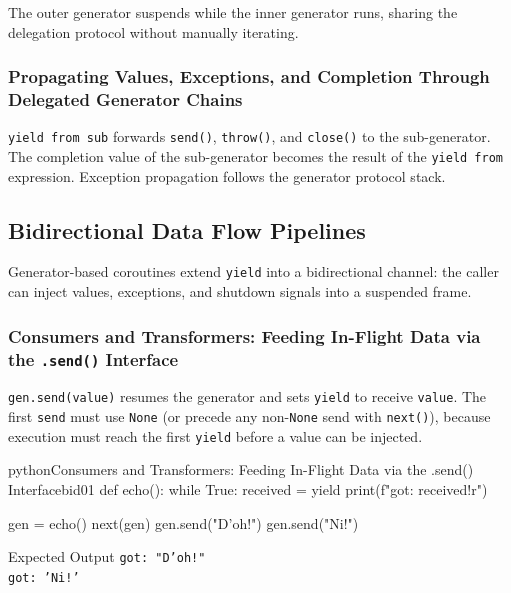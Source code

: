 \documentclass[a4paper,twoside]{report}
\begin{document}
The outer generator suspends while the inner generator runs, sharing the delegation protocol without manually iterating.

\subsubsection{Propagating Values, Exceptions, and Completion Through Delegated Generator Chains}

\texttt{yield from sub} forwards \texttt{send()}, \texttt{throw()}, and \texttt{close()} to the sub-generator. The completion value of the sub-generator becomes the result of the \texttt{yield from} expression. Exception propagation follows the generator protocol stack.


\subsection{Bidirectional Data Flow Pipelines}

Generator-based coroutines extend \texttt{yield} into a bidirectional channel: the caller can inject values, exceptions, and shutdown signals into a suspended frame.

\subsubsection{Consumers and Transformers: Feeding In-Flight Data via the \texttt{.send()} Interface}

\texttt{gen.send(value)} resumes the generator and sets \texttt{yield} to receive \texttt{value}. The first \texttt{send} must use \texttt{None} (or precede any non-\texttt{None} send with \texttt{next()}), because execution must reach the first \texttt{yield} before a value can be injected.

\begin{codebox}[]{python}{Consumers and Transformers: Feeding In-Flight Data via the .send() Interface}{bid01}
def echo():
    while True:
        received = yield
        print(f"got: {received!r}")

gen = echo()
next(gen)
gen.send("D'oh!")
gen.send("Ni!")
\end{codebox}


\begin{iobox}{Expected Output}
\texttt{got: "D'oh!"} \\
\texttt{got: 'Ni!'} \\
\end{iobox}
\end{document}
